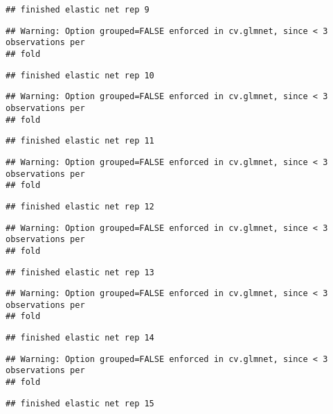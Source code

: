\documentclass[]{article}
\begin{document}
\begin{verbatim}
## finished elastic net rep 9
\end{verbatim}

\begin{verbatim}
## Warning: Option grouped=FALSE enforced in cv.glmnet, since < 3 observations per
## fold
\end{verbatim}

\begin{verbatim}
## finished elastic net rep 10
\end{verbatim}

\begin{verbatim}
## Warning: Option grouped=FALSE enforced in cv.glmnet, since < 3 observations per
## fold
\end{verbatim}

\begin{verbatim}
## finished elastic net rep 11
\end{verbatim}

\begin{verbatim}
## Warning: Option grouped=FALSE enforced in cv.glmnet, since < 3 observations per
## fold
\end{verbatim}

\begin{verbatim}
## finished elastic net rep 12
\end{verbatim}

\begin{verbatim}
## Warning: Option grouped=FALSE enforced in cv.glmnet, since < 3 observations per
## fold
\end{verbatim}

\begin{verbatim}
## finished elastic net rep 13
\end{verbatim}

\begin{verbatim}
## Warning: Option grouped=FALSE enforced in cv.glmnet, since < 3 observations per
## fold
\end{verbatim}

\begin{verbatim}
## finished elastic net rep 14
\end{verbatim}

\begin{verbatim}
## Warning: Option grouped=FALSE enforced in cv.glmnet, since < 3 observations per
## fold
\end{verbatim}

\begin{verbatim}
## finished elastic net rep 15
\end{verbatim}
\end{document}
